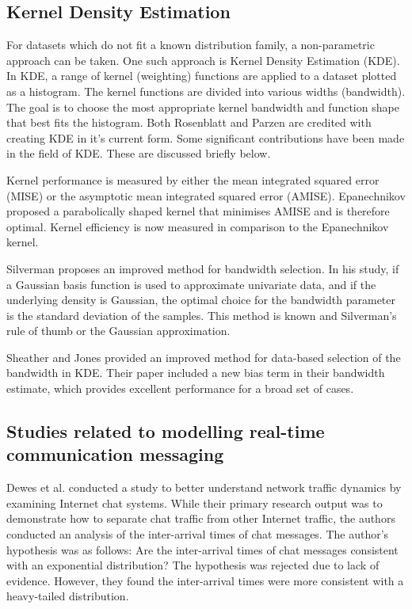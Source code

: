 \subsection{Kernel Density Estimation}

For datasets which do not fit a known distribution family, a non-parametric approach can be taken. One such approach is Kernel Density Estimation (KDE). In KDE, a range of kernel (weighting) functions are applied to a dataset plotted as a histogram. The kernel functions are divided into various widths (bandwidth). The goal is to choose the most appropriate kernel bandwidth and function shape that best fits the histogram. Both Rosenblatt\cite{rosenblatt1956remarks} and Parzen\cite{parzen1962estimation} are credited with creating KDE in it's current form. Some significant contributions have been made in the field of KDE. These are discussed briefly below. \par

Kernel performance is measured by either the mean integrated squared error (MISE) or the asymptotic mean integrated squared error (AMISE). Epanechnikov \cite{epanechnikov1969non} proposed a parabolically shaped kernel that minimises AMISE and is therefore optimal. Kernel efficiency is now measured in comparison to the Epanechnikov kernel.

Silverman \cite{silverman1986density} proposes an improved method for bandwidth selection. In his study, if a Gaussian basis function is used to approximate univariate data, and if the underlying density is Gaussian, the optimal choice for the bandwidth parameter is the standard deviation of the samples. This method is known and Silverman's rule of thumb or the Gaussian approximation. 

Sheather and Jones\cite{sheather1991reliable} provided an improved method for data-based selection of the bandwidth in KDE. Their paper included a new bias term in their bandwidth estimate, which provides excellent performance for a broad set of cases.

\subsection{Studies related to modelling real-time communication messaging}

Dewes et al. \cite{dewes2003analysis} conducted a study to better understand network traffic dynamics by examining Internet chat systems. While their primary research output was to demonstrate how to separate chat traffic from other Internet traffic, the authors conducted an analysis of the inter-arrival times of chat messages. The author's hypothesis was as follows: Are the inter-arrival times of chat messages consistent with an exponential distribution? The hypothesis was rejected due to lack of evidence. However, they found the inter-arrival times were more consistent with a heavy-tailed distribution.

